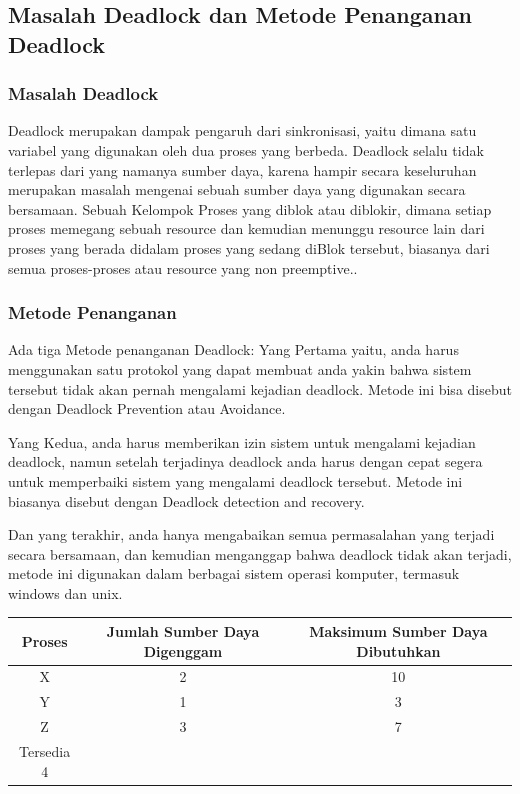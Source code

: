 \subsection {Masalah Deadlock dan Metode Penanganan Deadlock}
\subsubsection {Masalah Deadlock}
	Deadlock merupakan dampak pengaruh dari sinkronisasi, yaitu dimana satu variabel yang digunakan oleh dua proses yang berbeda. Deadlock selalu tidak terlepas dari yang namanya sumber daya, karena hampir secara keseluruhan merupakan masalah mengenai sebuah sumber daya yang digunakan secara bersamaan. Sebuah Kelompok Proses yang diblok atau diblokir, dimana setiap proses memegang sebuah resource dan kemudian menunggu resource lain dari proses yang berada didalam proses yang sedang diBlok tersebut, biasanya dari semua proses-proses atau resource yang non preemptive..
	
\subsubsection {Metode Penanganan}
	Ada tiga Metode penanganan Deadlock:
	Yang Pertama yaitu, anda harus menggunakan satu protokol yang dapat membuat anda yakin bahwa sistem tersebut tidak akan pernah mengalami kejadian deadlock. Metode ini bisa disebut dengan Deadlock Prevention atau Avoidance.
	
	Yang Kedua, anda harus memberikan izin sistem untuk mengalami kejadian deadlock, namun setelah terjadinya deadlock anda harus dengan cepat segera untuk memperbaiki sistem yang mengalami deadlock tersebut. Metode ini biasanya disebut dengan Deadlock detection and recovery.
	
	Dan yang terakhir, anda hanya mengabaikan semua permasalahan yang terjadi secara bersamaan, dan kemudian menganggap bahwa deadlock tidak akan terjadi, metode ini digunakan dalam berbagai sistem operasi komputer, termasuk windows dan unix.

\begin{table}[H]
\begin{tabular}{|c|c|c|}
\hline
Proses & Jumlah Sumber Daya Digenggam & Maksimum Sumber Daya Dibutuhkan\\
\hline
X   & 2 & 10\\
\hline
Y   & 1 & 3\\
\hline
Z   & 3 & 7\\
\hline
Tersedia 4  &  &\\
\hline
\end{tabular}
\end{table}

